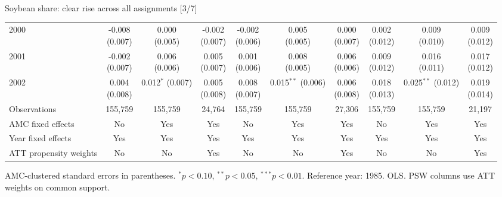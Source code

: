 \documentclass[aspectratio=169]{beamer}
\begin{document}
\begin{frame}{Soybean share: clear rise across all assignments [3/7]}
{\begin{tabular}{@{}l*{9}{c}@{}}
2000 & \shortstack{-0.008\\(0.007)} & \shortstack{0.000\\(0.005)} & \shortstack{-0.002\\(0.007)} & \shortstack{-0.002\\(0.006)} & \shortstack{0.005\\(0.005)} & \shortstack{0.000\\(0.007)} & \shortstack{0.002\\(0.012)} & \shortstack{0.009\\(0.010)} & \shortstack{0.009\\(0.012)} \\
2001 & \shortstack{-0.002\\(0.007)} & \shortstack{0.006\\(0.006)} & \shortstack{0.005\\(0.007)} & \shortstack{0.001\\(0.006)} & \shortstack{0.008\\(0.005)} & \shortstack{0.006\\(0.006)} & \shortstack{0.009\\(0.012)} & \shortstack{0.016\\(0.011)} & \shortstack{0.017\\(0.012)} \\
2002 & \shortstack{0.004\\(0.008)} & \shortstack{0.012$^{*}$\\(0.007)} & \shortstack{0.005\\(0.008)} & \shortstack{0.008\\(0.007)} & \shortstack{0.015$^{**}$\\(0.006)} & \shortstack{0.006\\(0.008)} & \shortstack{0.018\\(0.013)} & \shortstack{0.025$^{**}$\\(0.012)} & \shortstack{0.019\\(0.014)} \\
\midrule
Observations & 155,759 & 155,759 & 24,764 & 155,759 & 155,759 & 27,306 & 155,759 & 155,759 & 21,197 \\
AMC fixed effects & No & Yes & Yes & No & Yes & Yes & No & Yes & Yes \\
Year fixed effects & Yes & Yes & Yes & Yes & Yes & Yes & Yes & Yes & Yes \\
ATT propensity weights & No & No & Yes & No & No & Yes & No & No & Yes \\
\bottomrule
\end{tabular}%
}
\vspace{0.1em}
{\tiny\color{ZMidGray} AMC-clustered standard errors in parentheses. $^{*}p<0.10$, $^{**}p<0.05$, $^{***}p<0.01$. Reference year: 1985. OLS. PSW columns use ATT weights on common support.}
\end{frame}
\end{document}

